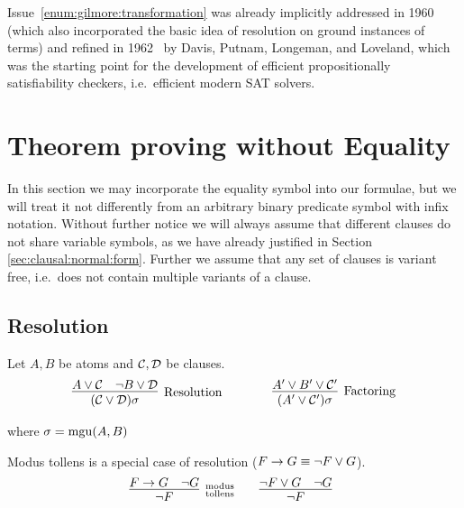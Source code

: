 Issue~\ref{enum:gilmore:transformation} was already implicitly
addressed in 1960~\cite{Davis:1960:CPQ:321033.321034}
(which also incorporated the basic idea of resolution on ground instances of terms)
and refined in 1962~\cite{Davis:1962:MPT:368273.368557}
by Davis, Putnam, Longeman, and Loveland,
which was the starting point for the development of efficient propositionally satisfiability checkers, i.e.~efficient modern SAT solvers.


\section{Theorem proving without Equality}\label{sec:theorem:proving:without:equaltiy}

In this section we may incorporate the equality symbol into our formulae,
but we will treat it not differently from an arbitrary binary predicate symbol with infix notation.
% 
Without further notice we will always assume 
that different clauses do not share variable symbols,
as we have already justified in Section \vref{sec:clausal:normal:form}.
Further we assume that any set of clauses is variant free, 
i.e.~does not contain multiple variants of a clause.

\subsection{Resolution}\label{sec:resolution}

\begin{definition}\label{def:resolution}
	Let \( A, B \) be atoms and 
	\( \mathcal{C}, \mathcal{D} \) be clauses.
	\begin{gather*}
	\infer
	[\text{Resolution}]
	{(\mcC\lor\mcD)\sigma}
	{A\lor\mcC&\lnot B\lor\mcD}
	\qquad\qquad
	\infer
	[\text{Factoring}]
	{(A'\lor\mcC')\sigma}
	{A'\lor B'\lor\mcC'}
	\end{gather*}
	\begin{center}
		where
		\( \sigma=\operatorname{mgu}(A,B) \)
	\end{center}
\end{definition}

\begin{example}Modus tollens is a special case of resolution (\( F\rightarrow G\equiv \lnot F\lor G \)).
	\begin{gather*}
	\infer[\substack{\text{modus}\\\text{tollens}}]
	{\lnot F}
	{F\limp G & \lnot G}
	\qquad
	\infer[]{\lnot F}{\lnot F\lor G & \lnot G}
	\end{gather*}
\end{example}

